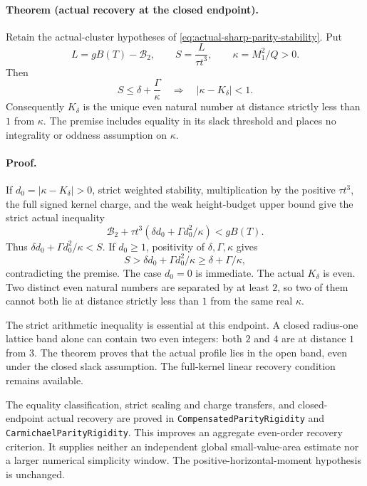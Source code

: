 \paragraph{Theorem (actual recovery at the closed endpoint).}
Retain the actual-cluster hypotheses of
\eqref{eq:actual-sharp-parity-stability}.  Put
\[
 L=gB(T)-\mathcal B_2,\qquad S=\frac{L}{\tau t^3},
 \qquad \kappa=M_1^2/Q>0.
\]
Then
\begin{equation}\label{eq:closed-parity-recovery}
 S\le\delta+\frac{\Gamma}{\kappa}
 \quad\Longrightarrow\quad
 |\kappa-K_\delta|<1.
\end{equation}
Consequently \(K_\delta\) is the unique even natural number at distance
strictly less than \(1\) from \(\kappa\).
The premise includes equality in its slack threshold and places no
integrality or oddness assumption on \(\kappa\).

\paragraph{Proof.}
If \(d_0=|\kappa-K_\delta|>0\), strict weighted stability, multiplication by
the positive \(\tau t^3\), the full signed kernel charge, and the weak
height-budget upper bound give the strict actual inequality
\[
 \mathcal B_2+\tau t^3
   \left(\delta d_0+\Gamma d_0^2/\kappa\right)<gB(T).
\]
Thus \(\delta d_0+\Gamma d_0^2/\kappa<S\).
If \(d_0\ge1\), positivity of \(\delta,\Gamma,\kappa\) gives
\[
 S>\delta d_0+\Gamma d_0^2/\kappa
   \ge\delta+\Gamma/\kappa,
\]
contradicting the premise.
The case \(d_0=0\) is immediate.
The actual \(K_\delta\) is even.  Two distinct even natural numbers are
separated by at least \(2\), so two of them cannot both lie at distance
strictly less than \(1\) from the same real \(\kappa\).

The strict arithmetic inequality is essential at this endpoint.
A closed radius-one lattice band alone can contain two even integers:
both \(2\) and \(4\) are at distance \(1\) from \(3\).
The theorem proves that the actual profile lies in the open band,
even under the closed slack assumption.
The full-kernel linear recovery condition remains available.

The equality classification, strict scaling and charge transfers, and
closed-endpoint actual recovery are proved in
\texttt{CompensatedParityRigidity} and
\texttt{CarmichaelParityRigidity}.
This improves an aggregate even-order recovery criterion.  It supplies
neither an independent global small-value-area estimate nor a larger
numerical simplicity window.  The positive-horizontal-moment hypothesis
is unchanged.

